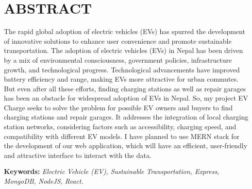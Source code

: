 \newpage
\section*{ABSTRACT}

 The rapid global adoption of electric vehicles (EVs) has spurred the development of innovative solutions to enhance user convenience and promote sustainable transportation. The adoption of electric vehicles (EVs) in Nepal has been driven by a mix of environmental consciousness, government policies, infrastructure growth, and technological progress. Technological advancements have improved battery efficiency and range, making EVs more attractive for urban commutes. But even after all these efforts, finding charging stations as well as repair garages has been an obstacle for widespread adoption of EVs in Nepal.  So, my project EV Charge seeks to solve the problem for possible EV owners and buyers to find charging stations and repair garages.  It addresses the integration of local charging station networks, considering factors such as accessibility, charging speed, and compatibility with different EV models. I have planned to use MERN stack for the development of our web application, which will have an efficient,
user-friendly and attractive interface to interact with the data.

\par
\textbf{Keywords:} \textit{Electric Vehicle (EV), Sustainable Transportation, Express, MongoDB, NodeJS, React.}

\newpage
